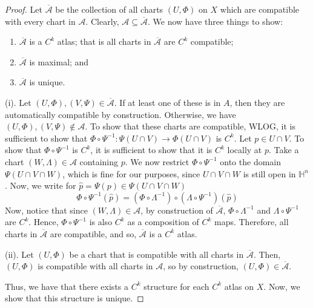 \documentclass{article}
\renewcommand{\H}{\mathbb{H}}
\newcommand{\cl}[1]{\overline{#1}}
\newcommand{\atl}[1]{\mathcal{#1}}
\theoremstyle{plain} %
\numberwithin{thm}{section} %
\theoremstyle{definition} %
\begin{document}
\begin{proof}
Let $\cl{\mathcal{A}}$ be the collection of all charts $(U,\Phi)$ on $X$ which are compatible with every chart in $\mathcal{A}$. Clearly, $\atl{A} \subseteq \cl{\atl{A}}$. We now have three things to show:
\begin{enumerate}[label=\rm(\roman*)]
    \item $\cl{\atl{A}}$ is a $C^k$ atlas; that is all charts in $\cl{\atl{A}}$ are $C^k$ compatible;
    \item $\cl{\atl{A}}$ is maximal; and
    \item $\cl{\atl{A}}$ is unique.
\end{enumerate}

(i). Let $(U, \Phi), (V, \Psi) \in \cl{\atl{A}}$. If at least one of these is in $A$, then they are automatically compatible by construction. Otherwise, we have $(U, \Phi), (V, \Psi) \notin \atl{A}$. To show that these charts are compatible, WLOG, it is sufficient to show that $\Phi \circ \Psi^{-1}: \Psi(U \cap V) \to \Phi(U \cap V)$ is $C^k$. Let $p \in U \cap V$. To show that $\Phi \circ \Psi^{-1}$ is $C^k$, it is sufficient to show that it is $C^k$ locally at $p$. Take a chart $(W, \Lambda) \in \atl{A}$ containing $p$. We now restrict $\Phi \circ \Psi^{-1}$ onto the domain $\Psi(U \cap V \cap W)$, which is fine for our purposes, since $U \cap V \cap W$ is still open in $\H^n$. Now, we write for $\widehat{p} = \Psi(p) \in \Psi(U \cap V \cap W)$
\[
    \Phi \circ \Psi^{-1}(\widehat{p}) = (\Phi \circ \Lambda^{-1}) \circ (\Lambda \circ \Psi^{-1})(\widehat{p})
\]
Now, notice that since $(W, \Lambda) \in \atl{A}$, by construction of $\cl{\atl{A}}$, $\Phi \circ \Lambda^{-1}$ and $\Lambda \circ \Psi^{-1}$ are $C^k$. Hence, $\Phi \circ \Psi^{-1}$ is also $C^k$ as a composition of $C^k$ maps. Therefore, all charts in $\cl{\atl{A}}$ are compatible, and so, $\cl{\atl{A}}$ is a $C^k$ atlas.

(ii). Let $(U, \Phi)$ be a chart that is compatible with all charts in $\cl{\atl{A}}$. Then, $(U, \Phi)$ is compatible with all charts in $\atl{A}$, so by construction, $(U, \Phi) \in \cl{\atl{A}}$.

Thus, we have that there exists a $C^k$ structure for each $C^k$ atlas on $X$. Now, we show that this structure is unique.


\end{proof}
\end{document}
